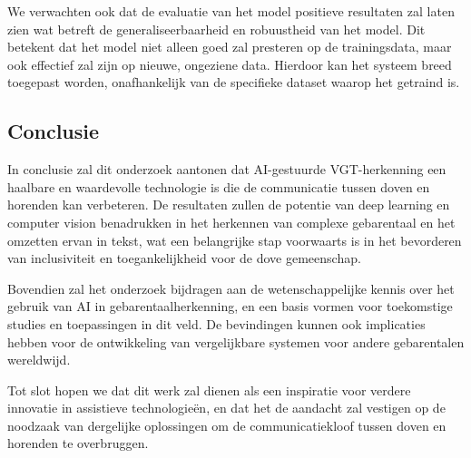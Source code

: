 We verwachten ook dat de evaluatie van het model positieve resultaten zal laten zien wat betreft de generaliseerbaarheid en robuustheid van het model. Dit betekent dat het model niet alleen goed zal presteren op de trainingsdata, maar ook effectief zal zijn op nieuwe, ongeziene data. Hierdoor kan het systeem breed toegepast worden, onafhankelijk van de specifieke dataset waarop het getraind is.

\subsection{Conclusie} In conclusie zal dit onderzoek aantonen dat AI-gestuurde VGT-herkenning een haalbare en waardevolle technologie is die de communicatie tussen doven en horenden kan verbeteren. De resultaten zullen de potentie van deep learning en computer vision benadrukken in het herkennen van complexe gebarentaal en het omzetten ervan in tekst, wat een belangrijke stap voorwaarts is in het bevorderen van inclusiviteit en toegankelijkheid voor de dove gemeenschap.

Bovendien zal het onderzoek bijdragen aan de wetenschappelijke kennis over het gebruik van AI in gebarentaalherkenning, en een basis vormen voor toekomstige studies en toepassingen in dit veld. De bevindingen kunnen ook implicaties hebben voor de ontwikkeling van vergelijkbare systemen voor andere gebarentalen wereldwijd.

Tot slot hopen we dat dit werk zal dienen als een inspiratie voor verdere innovatie in assistieve technologieën, en dat het de aandacht zal vestigen op de noodzaak van dergelijke oplossingen om de communicatiekloof tussen doven en horenden te overbruggen.